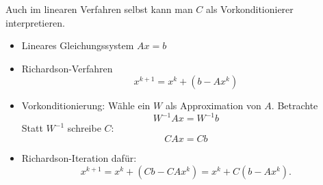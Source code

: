 \bigskip

Auch im linearen Verfahren selbst kann man $C$ als Vorkonditionierer interpretieren.
\begin{itemize}
 \item Lineares Gleichungssystem $Ax=b$
 \item Richardson-Verfahren
  \begin{equation*}
   x^{k+1}=x^k + (b-Ax^k)
  \end{equation*}
 \item Vorkonditionierung: Wähle ein $W$ als Approximation von $A$. Betrachte
  \begin{equation*}
   W^{-1}Ax=W^{-1}b
  \end{equation*}
  Statt $W^{-1}$ schreibe $C$:
  \begin{equation*}
   CAx=Cb
  \end{equation*}
 \item Richardson-Iteration dafür:
 \begin{equation*}
  x^{k+1}=x^k + (Cb-CAx^k) = x^k+C (b-Ax^k).
 \end{equation*}
\end{itemize}
